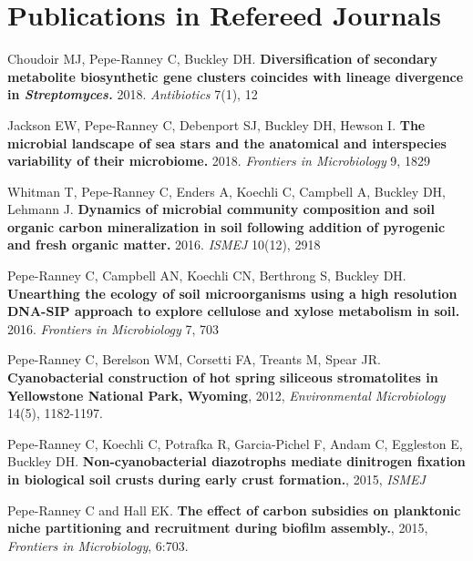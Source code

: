 \documentclass[letterpaper]{article}
\renewenvironment{itemize}{
  \begin{list}{}{
    \setlength{\leftmargin}{1.5em}
  }
}{
  \end{list}
}
\begin{document}
\section*{Publications in Refereed Journals}
\begin{itemize}

\item Choudoir MJ, Pepe-Ranney C, Buckley DH.
    \textbf{Diversification of secondary metabolite biosynthetic gene clusters
    coincides with lineage divergence in \textit{Streptomyces.}} 2018.
    \textit{Antibiotics} 7(1), 12

\item Jackson EW, Pepe-Ranney C, Debenport SJ, Buckley DH, Hewson I.
    \textbf{The microbial landscape of sea stars and the anatomical and
    interspecies variability of their microbiome.} 2018.
    \textit{Frontiers in Microbiology} 9, 1829

\item Whitman T, Pepe-Ranney C, Enders A, Koechli C,
    Campbell A, Buckley DH, Lehmann J. \textbf{Dynamics of microbial community
    composition and soil organic carbon mineralization in soil following addition
    of pyrogenic and fresh organic matter.} 2016. \textit{ISMEJ} 10(12), 2918

\item Pepe-Ranney C, Campbell AN, Koechli CN, Berthrong S, Buckley DH.
    \textbf{Unearthing the ecology of soil microorganisms using a high resolution
    DNA-SIP approach to explore cellulose and xylose metabolism in soil.} 2016.
    \textit{ Frontiers in Microbiology} 7, 703

\item Pepe-Ranney C, Berelson WM, Corsetti FA, Treants M, Spear JR.
    \textbf{Cyanobacterial construction of hot spring siliceous stromatolites in
    Yellowstone National Park, Wyoming}, 2012, 
    \textit{Environmental Microbiology} 14(5), 1182-1197. 

\item Pepe-Ranney C, Koechli C, Potrafka R, Garcia-Pichel F, Andam C, Eggleston E, Buckley DH. 
    \textbf{Non-cyanobacterial diazotrophs mediate dinitrogen fixation in
    biological soil crusts during early crust formation.}, 2015, \textit{ISMEJ}

\item Pepe-Ranney C and Hall EK. \textbf{The effect of carbon subsidies on
    planktonic niche partitioning and recruitment during biofilm
    assembly.}, 2015, \textit{Frontiers in Microbiology}, 6:703. 


\end{itemize}
\end{document}
